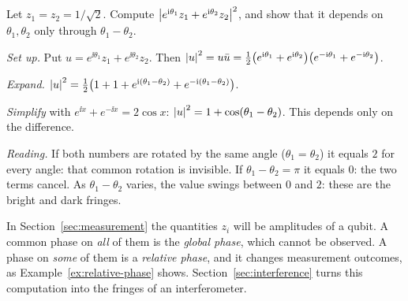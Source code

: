 \begin{example}\label{ex:relative-phase}
  Let $z_1=z_2=1/\sqrt2$. Compute $\left|e^{\mathrm{i}\theta_1}z_1+e^{\mathrm{i}\theta_2}z_2\right|^2$, and show that it depends on $\theta_1,\theta_2$ only through $\theta_1-\theta_2$.
\end{example}
\begin{solution}
  \begin{steps}
    \item \emph{Set up.} Put $u=e^{\ii\theta_1}z_1+e^{\ii\theta_2}z_2$. Then $\left|u\right|^2=u\bar u=\tfrac12\bigl(e^{\mathrm{i}\theta_1}+e^{\mathrm{i}\theta_2}\bigr)\bigl(e^{-\mathrm{i}\theta_1}+e^{-\mathrm{i}\theta_2}\bigr)$.
    \item \emph{Expand.} $\left|u\right|^2=\tfrac12\bigl(1+1+e^{\mathrm{i}(\theta_1-\theta_2)}+e^{-\mathrm{i}(\theta_1-\theta_2)}\bigr)$.
    \item \emph{Simplify} with $e^{\ii x}+e^{-\ii x}=2\cos x$: $\left|u\right|^2=1+\cos(\theta_1-\theta_2)$. This depends only on the difference.
    \item \emph{Reading.} If both numbers are rotated by the same angle ($\theta_1=\theta_2$) it equals $2$ for every angle: that common rotation is invisible. If $\theta_1-\theta_2=\pi$ it equals $0$: the two terms cancel. As $\theta_1-\theta_2$ varies, the value swings between $0$ and $2$: these are the bright and dark fringes.
  \end{steps}
\end{solution}

\begin{xref}
  In Section~\ref{sec:measurement} the quantities $z_i$ will be amplitudes of a qubit. A common phase on \emph{all} of them is the \emph{global phase}, which cannot be observed. A phase on \emph{some} of them is a \emph{relative phase}, and it changes measurement outcomes, as Example~\ref{ex:relative-phase} shows. Section~\ref{sec:interference} turns this computation into the fringes of an interferometer.
\end{xref}

